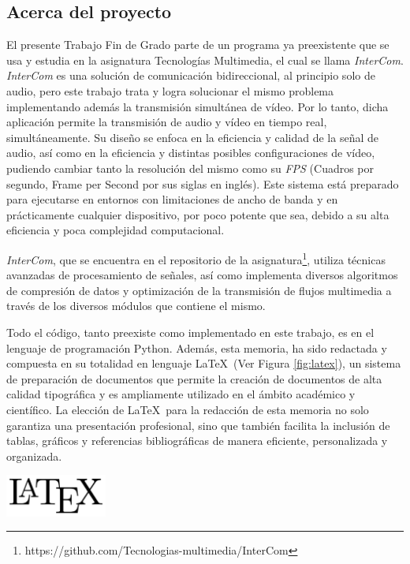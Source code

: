 \label{sec:justificacion_y_objetivos}

\subsection{Acerca del proyecto}

El presente Trabajo Fin de Grado parte de un programa ya preexistente que se usa y estudia en la asignatura Tecnologías Multimedia, el cual se llama \textit{InterCom}. \textit{InterCom} es una solución de comunicación bidireccional, al principio solo de audio, pero este trabajo trata y logra solucionar el mismo problema implementando además la transmisión simultánea de vídeo. Por lo tanto, dicha aplicación permite la transmisión de audio y vídeo en tiempo real, simultáneamente. Su diseño se enfoca en la eficiencia y calidad de la señal de audio, así como en la eficiencia y distintas posibles configuraciones de vídeo, pudiendo cambiar tanto la resolución del mismo como su \textit{FPS} (Cuadros por segundo, Frame per Second por sus siglas en inglés). Este sistema está preparado para ejecutarse en entornos con limitaciones de ancho de banda y en prácticamente cualquier dispositivo, por poco potente que sea, debido a su alta eficiencia y poca complejidad computacional.
\vspace{\baselineskip}

\textit{InterCom}, que se encuentra en el repositorio de la asignatura\footnote{https://github.com/Tecnologias-multimedia/InterCom}, utiliza técnicas avanzadas de procesamiento de señales, así como implementa diversos algoritmos de compresión de datos y optimización de la transmisión de flujos multimedia a través de los diversos módulos que contiene el mismo. 

\vspace{\baselineskip}
Todo el código, tanto preexiste como implementado en este trabajo, es en el lenguaje de programación Python. Además, esta memoria, ha sido redactada y compuesta en su totalidad en lenguaje \LaTeX~(Ver Figura \ref{fig:latex}), un sistema de preparación de documentos que permite la creación de documentos de alta calidad tipográfica y es ampliamente utilizado en el ámbito académico y científico. La elección de \LaTeX~para la redacción de esta memoria no solo garantiza una presentación profesional, sino que también facilita la inclusión de tablas, gráficos y referencias bibliográficas de manera eficiente, personalizada y organizada.

\vspace{\baselineskip}
\begin{center}
	\includegraphics[width = 0.25\textwidth]{images/LaTeX_logo.png}
	\label{fig:latex}
\end{center}
\vspace{\baselineskip}

